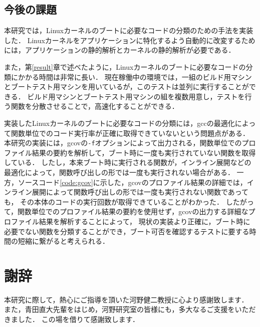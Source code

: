 \documentclass[graduation-thesis]{mlarticle}
\begin{document}
\subsection{今後の課題}

本研究では，Linuxカーネルのブートに必要なコードの分類のための手法を実装した．
Linuxカーネルをアプリケーションに特化するよう自動的に改変するためには，アプリケーションの静的解析とカーネルの静的解析が必要である．

また，第\ref{result}章で述べたように，Linuxカーネルのブートに必要なコードの分類にかかる時間は非常に長い．
現在稼働中の環境では，一組のビルド用マシンとブートテスト用マシンを用いているが，このテストは並列に実行することができる．
ビルド用マシンとブートテスト用マシンの組を複数用意し，テストを行う関数を分散させることで，高速化することができる．

実装したLinuxカーネルのブートに必要なコードの分類には，gccの最適化によって関数単位でのコード実行率が正確に取得できていないという問題点がある．
本研究の実装には，gcovの\texttt{-f}オプションによって出力される，関数単位でのプロファイル結果の要約を解析して，ブート時に一度も実行されていない関数を取得している．
したし，本来ブート時に実行される関数が，インライン展開などの最適化によって，関数呼び出しの形では一度も実行されない場合がある．
一方，ソースコード\ref{code:gcov}に示した，gcovのプロファイル結果の詳細では，インライン展開によって関数呼び出しの形では一度も実行されない関数であっても，
その本体のコードの実行回数が取得できていることがわかった．
したがって，関数単位でのプロファイル結果の要約を使用せず，gcovの出力する詳細なプロファイル結果を解析することによって，
現状の実装より正確に，ブート時に必要でない関数を分類することができ，ブート可否を確認するテストに要する時間の短縮に繋がると考えられる．

\clearpage
\section{謝辞}
\label{sec-8}

本研究に際して，熱心にご指導を頂いた河野健二教授に心より感謝致します．
また，青田直大先輩をはじめ，河野研究室の皆様にも，多大なるご支援をいただきました．
この場を借りて感謝致します．

\clearpage



\end{document}
